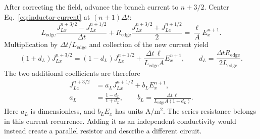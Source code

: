 \documentclass[10pt]{article}
\begin{document}
After correcting the field, advance the branch current to $n+3/2$.
Center Eq.~\eqref{eq:inductor-current} at $(n+1)\Delta t$:
\begin{equation}
    L_{\mathrm{edge}}
        \frac{J_{Lx}^{n+3/2}-J_{Lx}^{n+1/2}}{\Delta t}
    +R_{\mathrm{edge}}
        \frac{J_{Lx}^{n+3/2}+J_{Lx}^{n+1/2}}{2}
        =\frac{\ell}{A}E_x^{n+1}.
\end{equation}
Multiplication by $\Delta t/L_{\mathrm{edge}}$ and collection of the
new current yield
\begin{equation}
    (1+d_L)J_{Lx}^{n+3/2}
       =(1-d_L)J_{Lx}^{n+1/2}
         +\frac{\Delta t\,\ell}{L_{\mathrm{edge}}A}E_x^{n+1},
    \qquad d_L=\frac{\Delta t R_{\mathrm{edge}}}{2L_{\mathrm{edge}}}.
\end{equation}
The two additional coefficients are therefore
\begin{equation}
    \boxed{\begin{aligned}
    J_{Lx}^{n+3/2}&=a_L J_{Lx}^{n+1/2}+b_L E_x^{n+1},\\
    a_L&=\frac{1-d_L}{1+d_L},\qquad
    b_L=\frac{\Delta t\,\ell}{L_{\mathrm{edge}}A(1+d_L)}.
    \end{aligned}}
    \label{eq:inductor-coefficients}
\end{equation}
Here $a_L$ is dimensionless, and $b_LE_x$ has units
$\mathrm{A/m^2}$. The series resistance belongs in this current
recurrence. Adding it as an independent conductivity would instead
create a parallel resistor and describe a different circuit.
\end{document}
